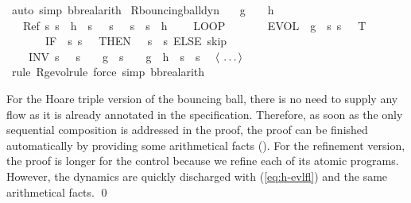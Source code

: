 \documentclass[envcountsame]{llncs}
\begin{document}
\begin{example}
\begin{isabellebody}
\ {\isacharparenleft}auto\ simp{\isacharcolon}\ bb{\isacharunderscore}real{\isacharunderscore}arith{\isacharparenright}\isanewline
\isanewline
{}\isamarkupfalse%
\ R{\isacharunderscore}bouncing{\isacharunderscore}ball{\isacharunderscore }dyn{\isacharcolon}\isanewline
\ \ \ {\isachardoublequoteopen}g\ {\isacharless}\ {}{\isachardoublequoteclose}\ \ {\isachardoublequoteopen}h\ {\isasymge}\ {}{\isachardoublequoteclose}\isanewline
\ \ \ {\isachardoublequoteopen}Ref\ {\isasymlceil}{\isasymlambda}s{\isachardot}\ s{\isachardollar}{}\ {\isacharequal}\ h\ {\isasymand}\ s{\isachardollar}{}\ {\isacharequal}\ {}{\isasymrceil}\ {\isasymlceil}{\isasymlambda}s{\isachardot}\ {}\ {\isasymle}\ s{\isachardollar}{}\ {\isasymand}\ s{\isachardollar}{}\ {\isasymle}\ h{\isasymrceil}\ {\isasymge}\ \isanewline
\ \ {\isacharparenleft}LOOP\ \isanewline
\ \ \ \ \ \ {\isacharparenleft}{\isacharparenleft}EVOL\ {\isacharparenleft}{\isasymphi}\ g{\isacharparenright}\ {\isacharparenleft}{\isasymlambda}\ s{\isachardot}\ s{\isachardollar}{}\ {\isasymge}\ {}{\isacharparenright}\ T{\isacharparenright}{\isacharsemicolon}\isanewline
\ \ \ \ \ \ \ {\isacharparenleft}IF\ {\isacharparenleft}{\isasymlambda}\ s{\isachardot}\ s{\isachardollar}{}\ {\isacharequal}\ {}{\isacharparenright}\ THEN\ {\isacharparenleft}{}\ {\isacharcolon}{\isacharcolon}{\isacharequal}\ {\isacharparenleft}{\isasymlambda}s{\isachardot}\ {\isacharminus}\ s{\isachardollar}{}{\isacharparenright}{\isacharparenright}\ ELSE\ skip{\isacharparenright}{\isacharparenright}\ \isanewline
\ \ \ \ INV\ {\isacharparenleft}{\isasymlambda}s{\isachardot}\ {}\ {\isasymle}\ s{\isachardollar}{}\ {\isasymand}\ {}\ {\isasymcdot}\ g\ {\isasymcdot}\ s{\isachardollar}{}\ {\isacharequal}\ {}\ {\isasymcdot}\ g\ {\isasymcdot}\ h\ {\isacharplus}\ s{\isachardollar}{}\ {\isasymcdot}\ s{\isachardollar}{}{\isacharparenright}{\isacharparenright}{\isachardoublequoteclose}\isanewline
\ \ $\langle \isa{\dots}\rangle$\ \isamarkupfalse%
\ {\isacharparenleft}rule\ R{\isacharunderscore}g{\isacharunderscore}evol{\isacharunderscore}rule{\isacharcomma}\ force\ simp{\isacharcolon}\ bb{\isacharunderscore}real{\isacharunderscore}arith{\isacharparenright} \isanewline
\end{isabellebody}

For the Hoare triple version of the bouncing ball, there is no need to supply any flow as it is already annotated in the specification. Therefore, as soon as the only sequential composition is addressed in the proof, the proof can be finished automatically by providing some arithmetical facts (). For the refinement version, the proof is longer for the control because we refine each of its atomic programs. However, the dynamics are quickly discharged with (\ref{eq:h-evlfl}) and the same arithmetical facts. \qed
\end{example}
\end{document}
